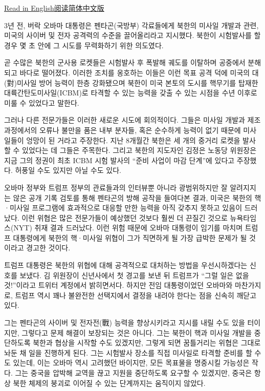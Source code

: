 \href{https://www.nytimes3xbfgragh.onion/2017/03/04/world/asia/north-korea-missile-program-sabotage.html}{Read
in
English}\href{http://cn.nytimes3xbfgragh.onion/usa/20170304/north-korea-missile-program-sabotage/}{阅读简体中文版}

3년 전, 버락 오바마 대통령은 펜타곤(국방부) 각료들에게 북한의 미사일
개발과 관련, 미국의 사이버 및 전자 공격력의 수준을 끌어올리라고
지시했다. 북한이 시험발사를 할 경우 몇 초 안에 그 시도를 무력화하기 위한
의도였다.

곧 수많은 북한의 군사용 로켓들은 시험발사 후 폭발해 궤도를 이탈하며
공중에서 분해되고 바다로 떨어졌다. 이러한 조치를 옹호하는 이들은 이런
목표 공격 덕에 미국의 대(對)미사일 방어 능력이 한층 강화됐으며 북한이
미국 본토의 도시를 핵무기를 탑재한 대륙간탄도미사일(ICBM)로 타격할 수
있는 능력을 갖출 수 있는 시점을 수년 이후로 미룰 수 있었다고 말한다.

그러나 다른 전문가들은 이러한 새로운 시도에 회의적이다. 그들은 미사일
개발과 제조 과정에서의 오류나 불만을 품은 내부 분자들, 혹은 순수하게
능력이 없기 때문에 미사일들이 엉망이 된 거라고 주장한다. 지난 8개월간
북한은 세 개의 중거리 로켓을 발사할 수 있었다는 데 그들은 주목한다.
그리고 북한의 지도자인 김정은 노동당 위원장은 지금 그의 정권이 최초 ICBM
시험 발사의 ``준비 사업이 마감 단계''에 있다고 주장했다. 허풍일 수도
있지만 아닐 수도 있다.

오바마 정부와 트럼프 정부의 관료들과의 인터뷰뿐 아니라 광범위하지만 잘
알려지지는 않은 공개 기록 검토를 통해 펜타곤의 방해 공작을 들여다본
결과, 미국은 북한의 핵·미사일 프로그램에 효과적으로 대응할 만한 능력을
아직 갖추지 못하고 있음이 드러났다. 이런 위협은 많은 전문가들이 예상했던
것보다 훨씬 더 끈질긴 것으로 뉴욕타임스(NYT) 취재 결과 드러났다. 이런
위험 때문에 오바마 대통령이 임기를 마치며 트럼프 대통령에게 북한의
핵·미사일 위협이 그가 직면하게 될 가장 급박한 문제가 될 것이라고 경고한
것이다.

트럼프 대통령은 북한의 위협에 대해 공격적으로 대처하는 방법을
우선시하겠다는 신호를 보냈다. 김 위원장이 신년사에서 첫 경고를 보낸 뒤
트럼프가 ``그럴 일은 없을 것!''이라고 트위터 계정에서 밝히면서다. 하지만
전임 대통령이었던 오바마와 마찬가지로, 트럼프 역시 꽤나 불완전한
선택지에서 결정을 내려야 한다는 점을 신속히 깨닫고 있다.

그는 펜타곤의 사이버 및 전자전(戰) 능력을 향상시키라고 지시를 내릴 수도
있을 터이지만, 그렇다고 문제 해결이 보장되는 것은 아니다. 그는 북한이
핵과 미사일 개발을 중단하도록 북한과 협상을 시작할 수도 있겠지만, 그렇게
되면 꿈틀거리는 위협은 그대로 놔둔 채 일을 진행하게 된다. 그는 시험발사
장소를 직접 미사일로 타격할 준비를 할 수도 있는데, 이는 오바마 역시
고려했던 바이지만, 모든 목표물을 명중시킬 가능성은 작다. 그는 중국을
압박해 교역을 끊고 지원을 중단하도록 요구할 수 있겠지만, 중국은 항상
북한 체제의 붕괴로 이어질 수 있는 단계까지는 움직이지 않았다.

